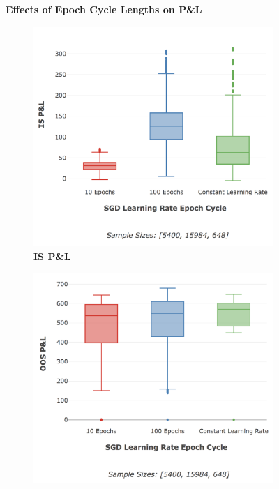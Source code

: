 \documentclass[a4paper,11pt,oneside]{article}
\theoremstyle{plain}
\theoremstyle{definition}
\begin{document}
		
	\begin{figure}[H]
		\centering
		\textbf{Effects of Epoch Cycle Lengths on P\&L}
		\begin{subfigure}{.5\textwidth}
			\centering 
			\includegraphics[scale=0.32]{images/results/complexity/IS_actual_pl_lr_epochs.png}
			\caption{\textbf{IS P\&L} 
				\newline }
			\label{figure-actual_is_pl_lr_epochs}
		\end{subfigure}%
		\begin{subfigure}{.5\textwidth}
			\centering 
			\includegraphics[scale=0.32]{images/results/complexity/OOS_actual_pl_lr_epochs.png}

\end{subfigure}
\end{figure}
\end{document}
